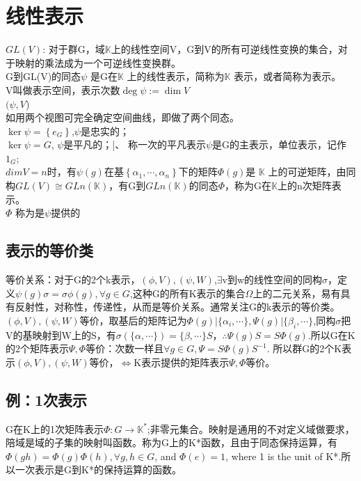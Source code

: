 \section{线性表示}
$GL(V)$: 对于群G，域$\mathbb K$上的线性空间V，G到V的所有可逆线性变换的集合，对于映射的乘法成为一个可逆线性变换群。\\
G到GL(V)的同态$\psi $ 是G在$\mathbb K$ 上的线性表示，简称为$\mathbb K$ 表示，或者简称为表示。\\
V叫做表示空间，表示次数$\deg \psi := \dim V$\\
$(\psi ,V$)\\
如用两个视图可完全确定空间曲线，即做了两个同态。\\
$\ker \psi =\left\{ e_G \right\}$,$\psi $是忠实的；\\
$\ker \psi =G$, $\psi$是平凡的；|、
称一次的平凡表示$\psi $是G的主表示，单位表示，记作$1_G$;\\
$dimV=n$时，有$\psi (g)$在基$\left\{ \alpha_1,\cdots , \alpha_n \right\}$下的矩阵$\Phi(g)$是 $\mathbb K$ 上的可逆矩阵，由同构$GL(V) \cong GLn(\mathbb K)$，有G到$GLn(\mathbb K)$的同态$\Phi$，称为G在$\mathbb K$上的n次矩阵表示。\\
$\Phi $ 称为是$\psi $提供的
\subsection{表示的等价类}
等价关系：对于G的2个k表示，$(\phi,V),(\psi,W)$,$\exists$v到w的线性空间的同构$\sigma$，定义$\psi(g)\sigma =\sigma \phi (g), \forall g \in G$,这种G的所有K表示的集合$\Omega$上的二元关系，易有具有反射性，对称性，传递性，从而是等价关系。通常关注G的k表示的等价类。\\
$(\phi,V),(\psi,W)$等价，取基后的矩阵记为$\Phi (g)| \{\alpha _i, \cdots\},\Psi (g)| \{\beta _i, \cdots\}$,同构$\sigma$把V的基映射到W上的S，有$\sigma (\{\alpha , \cdots\})=\{\beta, \cdots\}S$，$\therefore \Psi (g)S=S\Phi(g)$.所以G在K的2个矩阵表示$\Psi, \Phi$等价：次数一样且$\forall g \in G,\Psi =S\Phi (g)S^{-1}$. 所以群G的2个K表示$(\phi,V),(\psi,W)$等价，$\Leftrightarrow$K表示提供的矩阵表示$\Psi, \Phi$等价。
\subsection{例：1次表示}
G在K上的1次矩阵表示$\Phi: G \to \mathbb K^*$;非零元集合。映射是通用的不对定义域做要求，陪域是域的子集的映射叫函数。称为G上的K*函数，且由于同态保持运算，有$\Phi (gh)=\Phi (g)\Phi(h), \forall g,h \in G$, and $\Phi(e)=1$, where 1 is the unit of K*.所以一次表示是G到K*的保持运算的函数。

